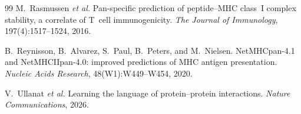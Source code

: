 \documentclass[11pt,a4paper]{article}
\begin{document}
\begin{thebibliography}{99}
M.~Rasmussen \emph{et al.}
\newblock Pan-specific prediction of peptide--MHC class~I complex stability, a correlate of T~cell
  immunogenicity.
\newblock \emph{The Journal of Immunology}, 197(4):1517--1524, 2016.

B.~Reynisson, B.~Alvarez, S.~Paul, B.~Peters, and M.~Nielsen.
\newblock NetMHCpan-4.1 and NetMHCIIpan-4.0: improved predictions of MHC antigen presentation.
\newblock \emph{Nucleic Acids Research}, 48(W1):W449--W454, 2020.

V.~Ullanat \emph{et al.}
\newblock Learning the language of protein--protein interactions.
\newblock \emph{Nature Communications}, 2026.

\end{thebibliography}
\end{document}

